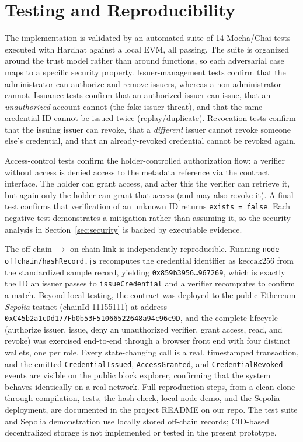 \documentclass[conference]{IEEEtran}
\begin{document}
\section{Testing and Reproducibility}

The implementation is validated by an automated suite of 14 Mocha/Chai tests executed with Hardhat against a local EVM, all passing. The suite is organized around the trust model rather than around functions, so each adversarial case maps to a specific security property. Issuer-management tests confirm that the administrator can authorize and remove issuers, whereas a non-administrator cannot. Issuance tests confirm that an authorized issuer can issue, that an \emph{unauthorized} account cannot (the fake-issuer threat), and that the same credential ID cannot be issued twice (replay/duplicate). Revocation tests confirm that the issuing issuer can revoke, that a \emph{different} issuer cannot revoke someone else's credential, and that an already-revoked credential cannot be revoked again.

Access-control tests confirm the holder-controlled authorization flow: a verifier without access is denied access to the metadata reference via the contract interface. The holder can grant access, and after this the verifier can retrieve it, but again only the holder can grant that access (and may also revoke it). A final test confirms that verification of an unknown ID returns \texttt{exists = false}. Each negative test demonstrates a mitigation rather than assuming it, so the security analysis in Section~\ref{sec:security} is backed by executable evidence.

The off-chain $\rightarrow$ on-chain link is independently reproducible. Running \texttt{node offchain/hashRecord.js}
recomputes the credential identifier as $\mathrm{keccak256}$ from the standardized sample record, yielding \texttt{0x859b3956\ldots967269}, which is exactly the ID an issuer passes to \texttt{issueCredential} and a verifier recomputes to confirm a match. Beyond local testing, the contract was deployed to the public Ethereum \emph{Sepolia} testnet (chainId 11155111) at address \texttt{0xC45b2a1cDd177Fb0b\allowbreak 53F51066522648a94c96c9D}, and the complete lifecycle (authorize issuer, issue, deny an unauthorized verifier, grant access, read, and revoke) was exercised end-to-end through a browser front end with four distinct wallets, one per role. Every state-changing call is a real, timestamped transaction, and the emitted \texttt{CredentialIssued}, \texttt{AccessGranted}, and \texttt{CredentialRevoked} events are visible on the public block explorer, confirming that the system behaves identically on a real network. Full reproduction steps, from a clean clone through compilation, tests, the hash check, local-node demo, and the Sepolia deployment, are documented in the project README on our repo.
The test suite and Sepolia demonstration use locally stored off-chain records; CID-based decentralized storage is not implemented or tested in the present prototype.
\end{document}
